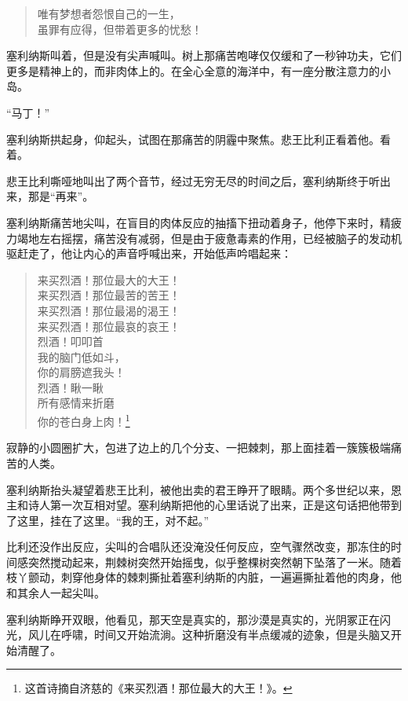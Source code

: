 \documentclass[AutoFakeBold=true]{book}
\begin{document}
\begin{quote}
	{\kaishu 唯有梦想者怨恨自己的一生，\\
	虽罪有应得，但带着更多的忧愁！}
\end{quote}

塞利纳斯叫着，但是没有尖声喊叫。树上那痛苦咆哮仅仅缓和了一秒钟功夫，它们更多是精神上的，而非肉体上的。在全心全意的海洋中，有一座分散注意力的小岛。

``马丁！''

塞利纳斯拱起身，仰起头，试图在那痛苦的阴霾中聚焦。悲王比利正看着他。{\kaishu 看着。}

悲王比利嘶哑地叫出了两个音节，经过无穷无尽的时间之后，塞利纳斯终于听出来，那是``再来''。

塞利纳斯痛苦地尖叫，在盲目的肉体反应的抽搐下扭动着身子，他停下来时，精疲力竭地左右摇摆，痛苦没有减弱，但是由于疲惫毒素的作用，已经被脑子的发动机驱赶走了，他让内心的声音呼喊出来，开始低声吟唱起来：

\begin{quote}
	{\kaishu 来买烈酒！那位最大的大王！\\
	来买烈酒！那位最苦的苦王！\\
	来买烈酒！那位最渴的渴王！\\
	来买烈酒！那位最哀的哀王！\\
	烈酒！叩叩首\\
	我的脑门低如斗，\\
	你的肩膀遮我头！\\
	烈酒！瞅一瞅\\
	所有感情来折磨\\
	你的苍白身上肉！}\footnote{这首诗摘自济慈的《来买烈酒！那位最大的大王！》。}
\end{quote}

寂静的小圆圈扩大，包进了边上的几个分支、一把棘刺，那上面挂着一簇簇极端痛苦的人类。

塞利纳斯抬头凝望着悲王比利，被他出卖的君王睁开了眼睛。两个多世纪以来，恩主和诗人第一次互相对望。塞利纳斯把他的心里话说了出来，正是这句话把他带到了这里，挂在了这里。``我的王，对不起。''

比利还没作出反应，尖叫的合唱队还没淹没任何反应，空气骤然改变，那冻住的时间感突然搅动起来，荆棘树突然开始摇曳，似乎整棵树突然朝下坠落了一米。随着枝丫颤动，刺穿他身体的棘刺撕扯着塞利纳斯的内脏，一遍遍撕扯着他的肉身，他和其余人一起尖叫。

塞利纳斯睁开双眼，他看见，那天空是真实的，那沙漠是真实的，光阴冢正在闪光，风儿在呼啸，时间又开始流淌。这种折磨没有半点缓减的迹象，但是头脑又开始清醒了。
\end{document}
